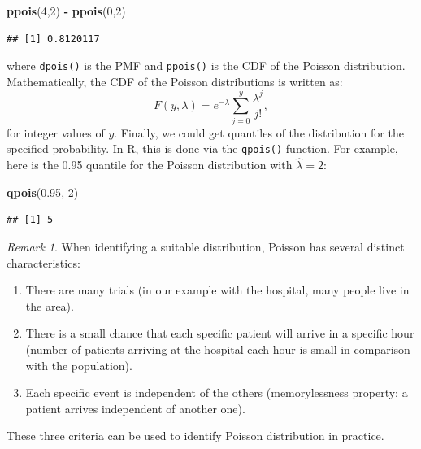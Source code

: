 \documentclass[
]{book}
\newenvironment{Shaded}{\begin{snugshade}}{\end{snugshade}}
\newcommand{\DecValTok}[1]{\textcolor[rgb]{0.00,0.00,0.81}{#1}}
\newcommand{\FloatTok}[1]{\textcolor[rgb]{0.00,0.00,0.81}{#1}}
\newcommand{\KeywordTok}[1]{\textcolor[rgb]{0.13,0.29,0.53}{\textbf{#1}}}
\newcommand{\NormalTok}[1]{#1}
\newcommand{\OperatorTok}[1]{\textcolor[rgb]{0.81,0.36,0.00}{\textbf{#1}}}
\newcommand{\StringTok}[1]{\textcolor[rgb]{0.31,0.60,0.02}{#1}}
\providecommand{\tightlist}{%
  \setlength{\itemsep}{0pt}\setlength{\parskip}{0pt}}
\theoremstyle{definition}
\theoremstyle{definition}
\theoremstyle{definition}
\theoremstyle{definition}
\theoremstyle{remark}
\newtheorem*{remark}{Remark}
\begin{document}
\begin{Shaded}
\begin{Highlighting}[]
\KeywordTok{ppois}\NormalTok{(}\DecValTok{4}\NormalTok{,}\DecValTok{2}\NormalTok{) }\OperatorTok{{-}}\StringTok{ }\KeywordTok{ppois}\NormalTok{(}\DecValTok{0}\NormalTok{,}\DecValTok{2}\NormalTok{)}
\end{Highlighting}
\end{Shaded}

\begin{verbatim}
## [1] 0.8120117
\end{verbatim}

where \texttt{dpois()} is the PMF and \texttt{ppois()} is the CDF of the Poisson distribution. Mathematically, the CDF of the Poisson distributions is written as:
\begin{equation}
    F(y, \lambda) = e^{-\lambda} \sum_{j=0}^{y} \frac{\lambda^j }{j!} ,
    \label{eq:PoissonCDF}
\end{equation}
for integer values of \(y\). Finally, we could get quantiles of the distribution for the specified probability. In R, this is done via the \texttt{qpois()} function. For example, here is the 0.95 quantile for the Poisson distribution with \(\hat{\lambda}=2\):

\begin{Shaded}
\begin{Highlighting}[]
\KeywordTok{qpois}\NormalTok{(}\FloatTok{0.95}\NormalTok{, }\DecValTok{2}\NormalTok{)}
\end{Highlighting}
\end{Shaded}

\begin{verbatim}
## [1] 5
\end{verbatim}

\begin{remark}
When identifying a suitable distribution, Poisson has several distinct characteristics:

\begin{enumerate}
\def\labelenumi{\arabic{enumi}.}
\tightlist
\item
  There are many trials (in our example with the hospital, many people live in the area).
\item
  There is a small chance that each specific patient will arrive in a specific hour (number of patients arriving at the hospital each hour is small in comparison with the population).
\item
  Each specific event is independent of the others (memorylessness property: a patient arrives independent of another one).
\end{enumerate}

These three criteria can be used to identify Poisson distribution in practice.
\end{remark}
\end{document}
